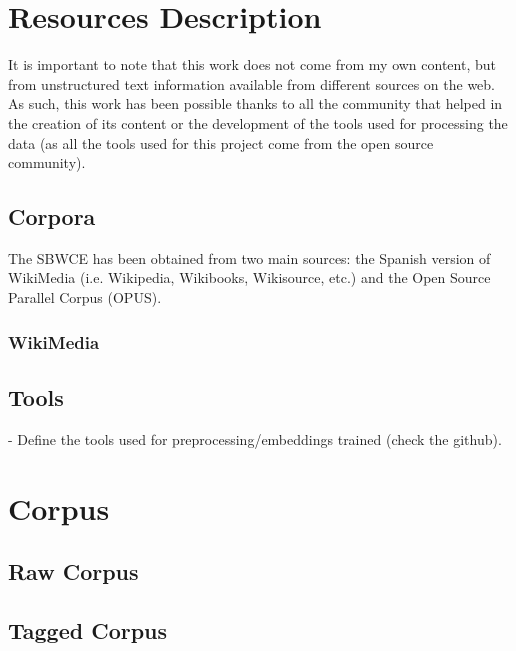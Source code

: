 \documentclass{article}
\begin{document}
\section{Resources Description}\label{sec:resources}

It is important to note that this work does not come from my own content, but
from unstructured text information available from different sources on the web.
As such, this work has been possible thanks to all the community that helped in
the creation of its content or the development of the tools used for processing
the data (as all the tools used for this project come from the open source
community).

\subsection{Corpora}

The SBWCE has been obtained from two main sources: the Spanish version of
WikiMedia (i.e. Wikipedia, Wikibooks, Wikisource, etc.) and the Open Source
Parallel Corpus (OPUS).

\subsubsection{WikiMedia}


\subsection{Tools}

- Define the tools used for preprocessing/embeddings trained (check the github).

\section{Corpus}\label{sec:corpus}

\subsection{Raw Corpus}

\subsection{Tagged Corpus}
\end{document}
